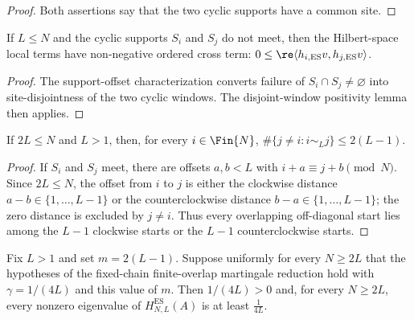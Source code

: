 \begin{proof}
    \leanok
    Both assertions say that the two cyclic supports have a common site.
\end{proof}

\begin{lemma}
    \label{lem:cyclic_window_nonoverlap_positive}
    \leanok
    If $L\le N$ and the cyclic supports $S_i$ and $S_j$ do not meet, then the
    Hilbert-space local terms have non-negative ordered cross term:
    $0\le\re\langle h_{i,\mathrm{ES}}v,h_{j,\mathrm{ES}}v\rangle$.
\end{lemma}

\begin{proof}
    \leanok
    The support-offset characterization converts failure of
    $S_i\cap S_j\ne\varnothing$ into site-disjointness of the two cyclic windows.
    The disjoint-window positivity lemma then applies.
\end{proof}

\begin{lemma}
    \label{lem:cyclic_window_overlap_cardinality}
    \leanok
    If $2L\le N$ and $L>1$, then, for every $i\in\Fin{N}$,
    $\#\{j\ne i: i\sim_L j\} \le 2(L-1)$.
\end{lemma}

\begin{proof}
    \leanok
    If $S_i$ and $S_j$ meet, there are offsets $a,b<L$ with
    $i+a\equiv j+b\pmod N$. Since $2L\le N$, the offset from $i$ to $j$ is
    either the clockwise distance $a-b\in\{1,\ldots,L-1\}$ or the
    counterclockwise distance $b-a\in\{1,\ldots,L-1\}$; the zero distance is
    excluded by $j\ne i$. Thus every overlapping off-diagonal start lies among
    the $L-1$ clockwise starts or the $L-1$ counterclockwise starts.
\end{proof}

\begin{lemma}
    \label{lem:parent_hamiltonian_finite_overlap_ordered_cross_term_gap}
    \leanok
    Fix $L>1$ and set $m=2(L-1)$. Suppose uniformly for every $N\ge2L$ that
    the hypotheses of the fixed-chain finite-overlap martingale reduction hold
    with $\gamma=1/(4L)$ and this value of $m$. Then $1/(4L)>0$ and, for
    every $N\ge2L$, every nonzero eigenvalue of
    $H_{N,L}^{\mathrm{ES}}(A)$ is at least $\frac{1}{4L}$.
\end{lemma}

